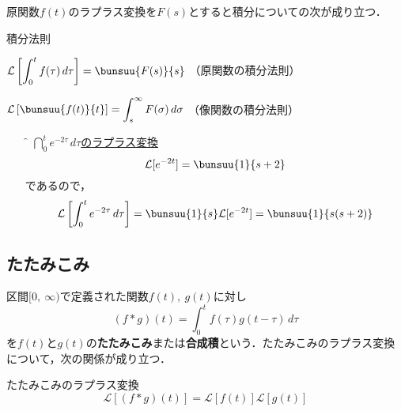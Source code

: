 原関数$f(t)$のラプラス変換を$F(s)$とすると積分についての次が成り立つ．

\begin{kousiki}{積分法則}
	\begin{enumerate}[label=\textbf{[\arabic*]}, labelsep=10pt, leftmargin=23pt]
		\item $\mathcal{L}\left[\dint_{0}^{t} f(\tau)\,d\tau\right] = \bunsuu{F(s)}{s}$ \hfill （原関数の積分法則）
		\item $\mathcal{L}\left[\bunsuu{f(t)}{t}\right] = \dint_{s}^{\infty} F(\sigma)\,d\sigma$ \hfill （像関数の積分法則）
	\end{enumerate}
\end{kousiki}

\begin{enumerate}[leftmargin=18pt, labelsep=10pt, itemindent=9pt]
	\item[\f{例}] \underline{$\dint_{0}^{t} e^{-2\tau}\,d\tau$のラプラス変換}
		\begin{equation*}
			\mathcal{L}[e^{-2t}] = \bunsuu{1}{s + 2}
		\end{equation*}
		であるので，
		\begin{equation*}
			\mathcal{L}\left[\int_{0}^{t} e^{-2\tau}\,d\tau\right] = \bunsuu{1}{s}\mathcal{L}[e^{-2t}] = \bunsuu{1}{s(s + 2)}
		\end{equation*}
\end{enumerate}



\subsection{たたみこみ}

区間$[0,\ \infty)$で定義された関数$f(t),\ g(t)$に対し
\begin{equation}
	(f * g)(t) = \int_{0}^{t} f(\tau)g(t - \tau)\,d\tau
\end{equation}
を$f(t)$と$g(t)$の\textbf{たたみこみ}または\textbf{合成積}という．たたみこみのラプラス変換について，次の関係が成り立つ．
\begin{kousiki}{たたみこみのラプラス変換}
	\begin{equation}
		\mathcal{L}[(f * g)(t)] = \mathcal{L}[f(t)]\mathcal{L}[g(t)]
	\end{equation}
\end{kousiki}

